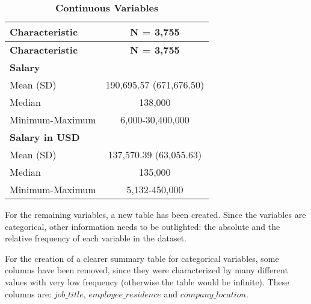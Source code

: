 \documentclass[
]{article}
\begin{document}
\begin{longtable}[]{@{}lc@{}}
\caption{\textbf{Continuous Variables}}\tabularnewline
\toprule\noalign{}
\textbf{Characteristic} & \textbf{N = 3,755} \\
\midrule\noalign{}
\endfirsthead
\toprule\noalign{}
\textbf{Characteristic} & \textbf{N = 3,755} \\
\midrule\noalign{}
\endhead
\bottomrule\noalign{}
\endlastfoot
\textbf{Salary} & \\
Mean (SD) & 190,695.57 (671,676.50) \\
Median & 138,000 \\
Minimum-Maximum & 6,000-30,400,000 \\
\textbf{Salary in USD} & \\
Mean (SD) & 137,570.39 (63,055.63) \\
Median & 135,000 \\
Minimum-Maximum & 5,132-450,000 \\
\end{longtable}

\newline

For the remaining variables, a new table has been created. Since the
variables are categorical, other information needs to be outlighted: the
absolute and the relative frequency of each variable in the dataset.

For the creation of a clearer summary table for categorical variables,
some columns have been removed, since they were characterized by many
different values with very low frequency (otherwise the table would be
infinite). These columns are: \(job\_title\), \(employee\_residence\)
and \(company\_location\).
\end{document}
